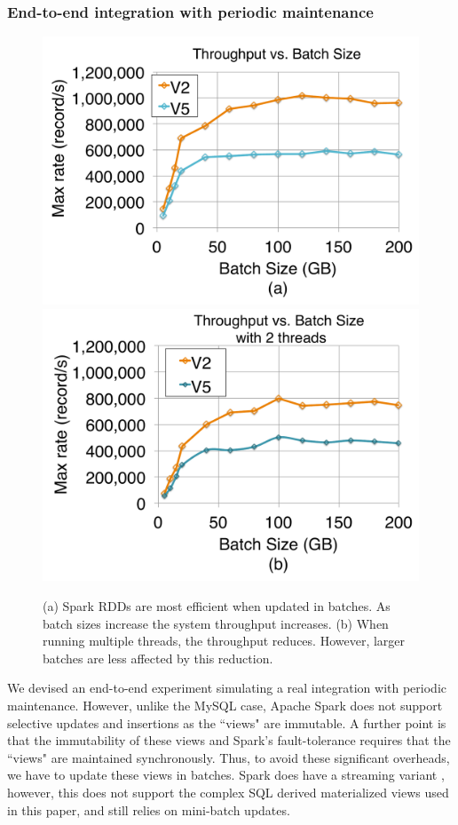 \subsubsection{End-to-end integration with periodic maintenance}
\begin{figure}[t]
\centering
 \includegraphics[scale=0.14]{exp/con_1.pdf}
 \includegraphics[scale=0.14]{exp/con_2.pdf}
 \caption{(a) Spark RDDs are most efficient when updated in batches. As batch sizes increase the system throughput increases. (b) When running multiple threads, the throughput reduces. However, larger batches are less affected by this reduction. \label{conv-2}}
\end{figure}

We devised an end-to-end experiment simulating a real integration with periodic maintenance.
However, unlike the MySQL case, Apache Spark does not support selective updates and insertions as the ``views" are immutable.
A further point is that the immutability of these views and Spark's fault-tolerance requires that the ``views" are maintained synchronously.
Thus, to avoid these significant overheads, we have to update these views in batches.
Spark does have a streaming variant \cite{zaharia2012discretized}, however, this does not support the complex SQL derived materialized views used in this paper, and still relies on mini-batch updates.

